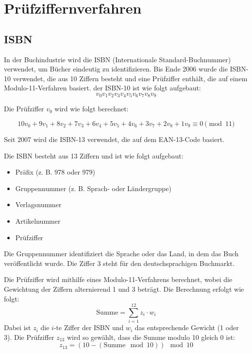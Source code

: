 
\chapter{Prüfziffernverfahren}


\section{ISBN}

In der Buchindustrie wird die ISBN (Internationale Standard-Buchnummer)
verwendet, um Bücher eindeutig zu identifizieren. 
Bis Ende 2006 wurde die ISBN-10 verwendet, die aus 10 Ziffern besteht und eine Prüfziffer enthält, die auf einem Modulo-11-Verfahren basiert.
der ISBN-10 ist wie folgt aufgebaut:
\begin{equation}
\label{eq:ISBN-10}
v_0 v_1 v_2 v_3 v_4 v_5 v_6 v_7 v_8 v_9
\end{equation}

Die Prüfziffer \(v_9\) wird wie folgt berechnet:

\begin{equation}
\label{eq:ISBN-10-Prüfziffer}
        10v_0 + 9v_1 + 8v_2 + 7v_3 + 6v_4 + 5v_5 + 4v_6 + 3v_7 + 2v_8 + 1v_9 \equiv 0 \pmod{11}
\end{equation}

Seit 2007 wird die ISBN-13 verwendet, die auf dem EAN-13-Code basiert.

Die ISBN besteht aus 13 Ziffern und ist wie folgt aufgebaut: 
\begin{itemize}
    \item Präfix (z. B. 978 oder 979)
    \item Gruppennummer (z. B. Sprach- oder Ländergruppe)
    \item Verlagsnummer
    \item Artikelnummer
    \item Prüfziffer
\end{itemize}


Die Gruppennummer identifiziert die Sprache oder das Land, in dem das Buch veröffentlicht wurde. Die Ziffer 3 steht für den deutschsprachigen Buchmarkt.

Die Prüfziffer wird mithilfe eines Modulo-11-Verfahrens berechnet, wobei die Gewichtung der Ziffern alternierend 1 und 3 beträgt. Die Berechnung erfolgt wie folgt:
\[
\text{Summe} = \sum_{i=1}^{12} z_i \cdot w_i
\]
Dabei ist \( z_i \) die \( i \)-te Ziffer der ISBN und \( w_i \) das entsprechende Gewicht (1 oder 3). Die Prüfziffer \( z_{13} \) wird so gewählt, dass die Summe modulo 10 gleich 0 ist:
\[
z_{13} = (10 - (\text{Summe} \mod 10)) \mod 10
\]

